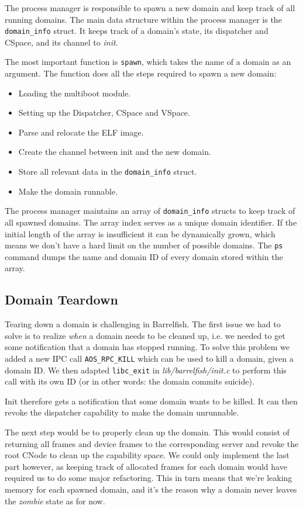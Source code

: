 \documentclass[a4paper,10pt]{article}
\newcommand{\filepath}[1]{\emph{ #1}}
\begin{document}
The process manager is responsible to spawn a new domain and keep track of all running domains.
The main data structure within the process manager is the \lstinline!domain_info! struct.
It keeps track of a domain's state, its dispatcher and CSpace, and its channel to \emph{init}.

The most important function is \lstinline!spawn!, which takes the name of a domain as an argument.
The function does all the steps required to spawn a new domain:
\begin{itemize}
 \item Loading the multiboot module.
 \item Setting up the Dispatcher, CSpace and VSpace.
 \item Parse and relocate the ELF image.
 \item Create the channel between init and the new domain.
 \item Store all relevant data in the \lstinline!domain_info! struct.
 \item Make the domain runnable.
\end{itemize}

The process manager maintains an array of \lstinline!domain_info! structs to keep track of all spawned domains.
The array index serves as a unique domain identifier.
If the initial length of the array is insufficient it can be dynamically grown, which means we don't have a hard limit on the number of possible domains.
The \lstinline!ps! command dumps the name and domain ID of every domain stored within the array.

\subsection {Domain Teardown}

Tearing down a domain is challenging in Barrelfish.
The first issue we had to solve is to realize \emph{when} a domain needs to be cleaned up, i.e. we needed to get some notification that a domain has stopped running.
To solve this problem we added a new IPC call \lstinline!AOS_RPC_KILL! which can be used to kill a domain, given a domain ID.
We then adapted \lstinline!libc_exit! in \filepath{lib/barrelfish/init.c} to perform this call with its own ID (or in other words: the domain commits suicide).

Init therefore gets a notification that some domain wants to be killed.
It can then revoke the dispatcher capability to make the domain unrunnable.

The next step would be to properly clean up the domain.
This would consist of returning all frames and device frames to the corresponding server and revoke the root CNode to clean up the capability space.
We could only implement the last part however, as keeping track of allocated frames for each domain would have required us to do some major refactoring.
This in turn means that we're leaking memory for each spawned domain, and it's the reason why a domain never leaves the \emph{zombie} state as for now.
\end{document}

